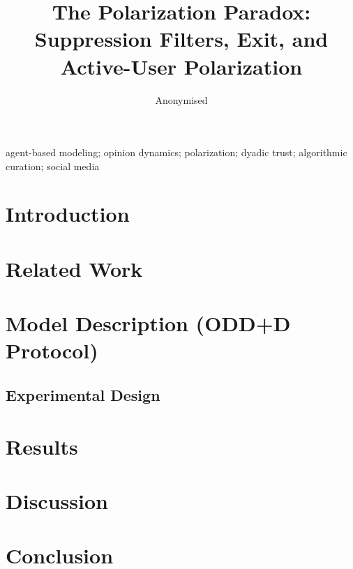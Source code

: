 \documentclass{JASSS}
\title{The Polarization Paradox: Suppression Filters, Exit, and Active-User Polarization}
\author[1]{Anonymised}
\affil[1]{Anonymised}
\begin{document}
\maketitle

\begin{abstract}{%
%
}
\end{abstract}

\begin{keywords}{agent-based modeling; opinion dynamics; polarization; dyadic trust; algorithmic curation; social media}
\end{keywords}

\parano{}

\section{Introduction}
\label{sec:intro}


\section{Related Work}
\label{sec:related}


\section{Model Description (ODD+D Protocol)}
\label{sec:model}


\subsection{Experimental Design}
\label{sec:experiment}


\section{Results}
\label{sec:results}


\section{Discussion}
\label{sec:discussion}


\section{Conclusion}
\label{sec:conclusion}

\end{document}
